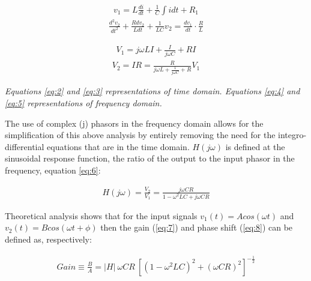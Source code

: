 \documentclass[12pt]{article}
\begin{document}
\newpage
\hspace{2ex}
\begin{minipage}{0.45\textwidth}
    \begin{gather}
        v_1=L\frac{di}{dt}+\frac1C\int idt+R_1\label{eq:2}
    \end{gather}
    \vspace{-1.5em}
    \begin{gather}
        \frac{d^2v_2}{dt^2} + \frac{R dv_2}{L dt} + \frac{1}{LC} v_2 = \frac{dv_1}{dt} \cdot \frac{R}{L}\label{eq:3}
    \end{gather}
\end{minipage}
\hspace{-1.5ex}
\begin{minipage}{0.45\textwidth}
    \begin{gather}
        V_1 = j \omega L I + \frac{I}{j \omega C} + RI\label{eq:4}
    \end{gather}
    \vspace{-1.5em}
    \begin{gather}\label{eq:5}
        V_2 = IR = \frac{R}{j \omega L + \frac{1}{j \omega C} + R} V_1
    \end{gather}
\end{minipage}

\vspace{0.25cm}

\textit{Equations \ref{eq:2} and \ref{eq:3} representations of time domain. Equations \ref{eq:4} and \ref{eq:5} representations of frequency domain.} \cite{UCDlcr}

The use of complex (j) phasors in the frequency domain allows for the simplification of this above analysis by entirely removing
the need for the integro-differential equations that are in the time domain. $H(j \omega)$ is defined at the sinusoidal response function, 
the ratio of the output to the input phasor in the frequency, equation \ref{eq:6}:

\begin{gather} \label{eq:6}
    H (j \omega) = \frac{V_2}{V_1} = \frac{j \omega C R}{1 - \omega^2 L C + j \omega C R}
\end{gather}

Theoretical analysis shows that for the input signals $v_1(t) = Acos( \omega t)$ and $v_2(t) = Bcos(\omega t + \phi)$ then the gain (\ref{eq:7}) and phase shift (\ref{eq:8}) can be defined as, respectively:

\begin{gather} \label{eq:7}
    Gain \equiv \frac{B}{A} = \lvert H \rvert \: \omega CR \: \left[ (1 - \omega^2 LC)^2 + (\omega CR)^2 \right] ^ {- \frac{1}{2}}
\end{gather}
\end{document}
